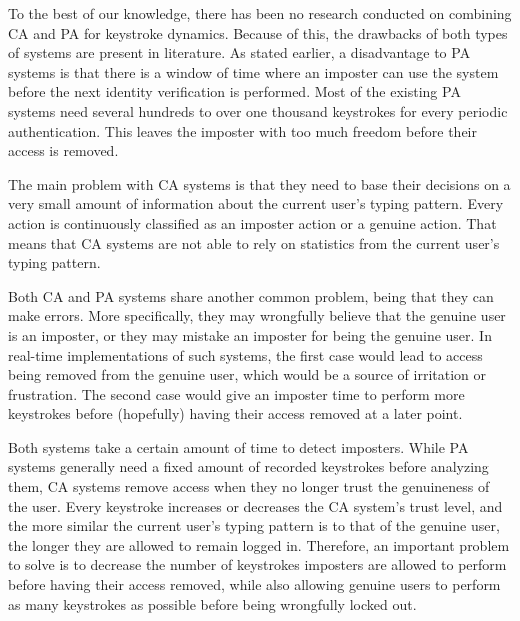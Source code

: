 \documentclass[informationsecurity]{gucmasterproject}
\begin{document}
To the best of our knowledge, there has been no research conducted on combining CA and PA for keystroke dynamics.
Because of this, the drawbacks of both types of systems are present in literature.
As stated earlier, a disadvantage to PA systems is that there is a window of time where an imposter can use the system before the next identity verification is performed.
Most of the existing PA systems need several hundreds to over one thousand keystrokes for every periodic authentication.
This leaves the imposter with too much freedom before their access is removed.

The main problem with CA systems is that they need to base their decisions on a very small amount of information about the current user's typing pattern.
Every action is continuously classified as an imposter action or a genuine action. 
That means that CA systems are not able to rely on statistics from the current user's typing pattern.

Both CA and PA systems share another common problem, being that they can make errors.
More specifically, they may wrongfully believe that the genuine user is an imposter, or they may mistake an imposter for being the genuine user.
In real-time implementations of such systems, the first case would lead to access being removed from the genuine user, which would be a source of irritation or frustration.
The second case would give an imposter time to perform more keystrokes before (hopefully) having their access removed at a later point.

Both systems take a certain amount of time to detect imposters.
While PA systems generally need a fixed amount of recorded keystrokes before analyzing them, CA systems remove access when they no longer trust the genuineness of the user.
Every keystroke increases or decreases the CA system's trust level, and the more similar the current user's typing pattern is to that of the genuine user, the longer they are allowed to remain logged in. 
Therefore, an important problem to solve is to decrease the number of keystrokes imposters are allowed to perform before having their access removed, while also allowing genuine users to perform as many keystrokes as possible before being wrongfully locked out.

\end{document}
